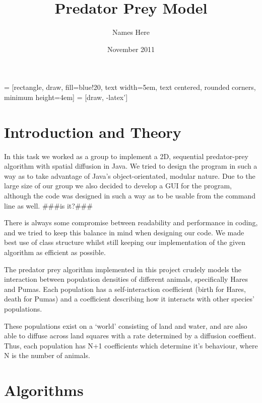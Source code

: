 \documentclass[12pt]{report}
\title{Predator Prey Model}
\author{Names Here}
\date{November 2011}
\begin{document}
\usetikzlibrary{shapes,arrows}


 = [rectangle, draw, fill=blue!20, 
    text width=5em, text centered, rounded corners, minimum height=4em]
 = [draw, -latex']

\maketitle

\begin{abstract}
\end{abstract}

\tableofcontents

\chapter{Introduction and Theory}

In this task we worked as a group to implement a 2D, sequential predator-prey algorithm with spatial diffusion
in Java. We tried to design the program in such a way as to take advantage of Java's object-orientated, modular nature. 
Due to the large size of our group we also decided to develop a GUI for the program, although the code was designed 
in such a way as to be usable from the command line as well. ###is it?###\newline{}

There is always some compromise between readability and performance in coding, and we tried to keep this balance in mind
when designing our code. We made best use of class structure whilst still keeping our implementation of the given 
algorithm as efficient as possible.\newline{}

The predator prey algorithm implemented in this project crudely models the interaction between population densities of different animals, specifically Hares and Pumas. Each population has a self-interaction coefficient (birth for Hares, death for Pumas) and a coefficient describing how it interacts with other species' populations. \newline{}

These populations exist on a `world' consisting of land and water, and are also able to diffuse across land squares with a rate determined by a diffusion coeffient. Thus, each population has N+1 coefficients which determine it's behaviour, where N is the number of animals.

\chapter{Algorithms}
\end{document}
